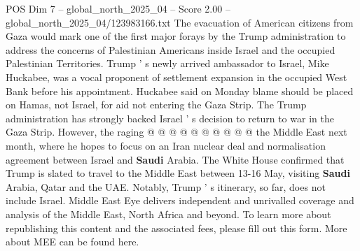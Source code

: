 \begin{textsample}{POS Dim 7 – global\_north\_2025\_04 – Score 2.00 – global\_north\_2025\_04/123983166.txt}
The evacuation of American citizens from Gaza would mark one of the first major forays by the Trump administration to address the concerns of Palestinian Americans inside Israel and the occupied Palestinian Territories.
Trump ' s newly arrived ambassador to Israel, Mike Huckabee, was a vocal proponent of settlement expansion in the occupied West Bank before his appointment.
Huckabee said on Monday blame should be placed on Hamas, not Israel, for aid not entering the Gaza Strip.
The Trump administration has strongly backed Israel ' s decision to return to war in the Gaza Strip.
However, the raging @ @ @ @ @ @ @ @ @ @ the Middle East next month, where he hopes to focus on an Iran nuclear deal and normalisation agreement between Israel and \textbf{Saudi} Arabia.
The White House confirmed that Trump is slated to travel to the Middle East between 13-16 May, visiting \textbf{Saudi} Arabia, Qatar and the UAE.
Notably, Trump ' s itinerary, so far, does not include Israel.
Middle East Eye delivers independent and unrivalled coverage and analysis of the Middle East, North Africa and beyond.
To learn more about republishing this content and the associated fees, please fill out this form.
More about MEE can be found here.

\end{textsample}
